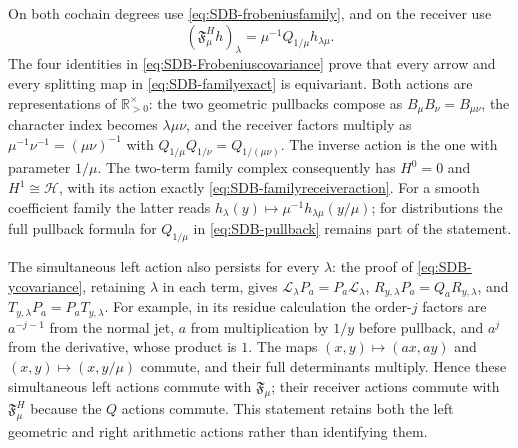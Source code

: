 On both cochain degrees use \eqref{eq:SDB-frobeniusfamily}, and
on the receiver use
\begin{equation}\tag{SDB54}\label{eq:SDB-familyreceiveraction}
 (\mathfrak F_\mu^{H}h)_\lambda
       =\mu^{-1}Q_{1/\mu}h_{\lambda\mu}.
\end{equation}
The four identities in \eqref{eq:SDB-Frobeniuscovariance} prove
that every arrow and every splitting map in
\eqref{eq:SDB-familyexact} is equivariant. Both actions are
representations of $\mathbb R_{>0}^{\times}$: the two geometric
pullbacks compose as $B_\mu B_\nu=B_{\mu\nu}$, the character
index becomes $\lambda\mu\nu$, and the receiver factors multiply
as $\mu^{-1}\nu^{-1}=(\mu\nu)^{-1}$ with
$Q_{1/\mu}Q_{1/\nu}=Q_{1/(\mu\nu)}$.
The inverse action is the one with parameter $1/\mu$.
The two-term family complex consequently has $H^0=0$ and
$H^1\cong\mathcal H$, with its action exactly
\eqref{eq:SDB-familyreceiveraction}.
For a smooth coefficient family the latter reads
$h_\lambda(y)\mapsto\mu^{-1}h_{\lambda\mu}(y/\mu)$;
for distributions the full pullback formula for $Q_{1/\mu}$
in \eqref{eq:SDB-pullback} remains part of the statement.

The simultaneous left action also persists for every $\lambda$:
the proof of \eqref{eq:SDB-ycovariance}, retaining $\lambda$ in
each term, gives
$\mathcal L_\lambda P_a=P_a\mathcal L_\lambda$,
$R_{y,\lambda}P_a=Q_aR_{y,\lambda}$, and
$T_{y,\lambda}P_a=P_aT_{y,\lambda}$.
For example, in its residue calculation the order-$j$ factors are
$a^{-j-1}$ from the normal jet, $a$ from multiplication by $1/y$
before pullback, and $a^j$ from the derivative, whose product is
$1$. The maps $(x,y)\mapsto(ax,ay)$ and
$(x,y)\mapsto(x,y/\mu)$ commute, and their full determinants
multiply. Hence these simultaneous left actions commute with
$\mathfrak F_\mu$; their receiver actions commute with
$\mathfrak F_\mu^H$ because the $Q$ actions commute. This statement
retains both the left geometric and right arithmetic actions rather
than identifying them.

